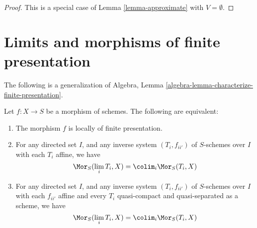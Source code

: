 \begin{proof}
This is a special case of Lemma \ref{lemma-approximate}
with $V = \emptyset$.
\end{proof}






\section{Limits and morphisms of finite presentation}
\label{section-finite-presentation}

\noindent
The following is a generalization of
Algebra, Lemma \ref{algebra-lemma-characterize-finite-presentation}.

\begin{proposition}
\label{proposition-characterize-locally-finite-presentation}
\begin{reference}
\cite[IV, Proposition 8.14.2]{EGA}
\end{reference}
Let $f : X \to S$ be a morphism of schemes.
The following are equivalent:
\begin{enumerate}
\item The morphism $f$ is locally of finite presentation.
\item For any directed set $I$, and any
inverse system $(T_i, f_{ii'})$ of $S$-schemes over $I$
with each $T_i$ affine, we have
$$
\Mor_S(\lim_i T_i, X) =
\colim_i \Mor_S(T_i, X)
$$
\item For any directed set $I$, and any
inverse system $(T_i, f_{ii'})$ of $S$-schemes over $I$
with each $f_{ii'}$ affine and every $T_i$ quasi-compact and
quasi-separated as a scheme, we have
$$
\Mor_S(\lim_i T_i, X) =
\colim_i \Mor_S(T_i, X)
$$
\end{enumerate}
\end{proposition}

